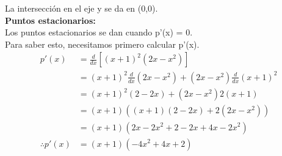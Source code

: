 \documentclass[12pt]{article}
\begin{document}
 La intersección en el eje y se da en (0,0).\\
\textbf  {Puntos estacionarios:}\\
 Los puntos estacionarios se dan cuando p'(x) = 0.\\
 Para saber esto, necesitamos primero calcular p'(x).\\
 \begin{equation*}
  \begin{split}
    p'(x)
    &=  \frac{d} {dx} \left[ (x + 1)^2 (2x-x^2)\right]  \\
    &=   (x + 1)^2  \frac{d} {dx}(2x-x^2) + (2x-x^2) \frac{d} {dx} (x + 1)^2  \\
    &=   (x + 1)^2 (2-2x) + (2x-x^2)  2(x + 1)  \\
    &=   (x + 1) \left(  (x + 1) (2-2x)  +  2(2x-x^2)  \right) \\
    &=   (x + 1) \left(  2x-2x^{2}+2-2x  +  4x-2x^2  \right) \\
    \therefore
    p'(x)
    &=    (x + 1)\left(  -4x^{2} +4x+2\right) \\ \\
  \end{split}
 \end{equation*}
\end{document}
